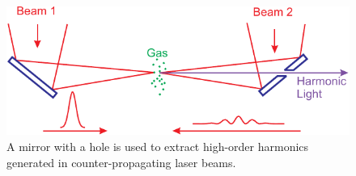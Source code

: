 \documentclass[oneside, astronomy, noacknowlegments]{BYUPhys}
\begin{document}
\begin{figure}
    \centerline{\includegraphics{Graphic1}}
    \caption[Experimental ODMR for CdTe]{\label{fig:CdTeResults}
     A mirror with a hole is used to extract high-order harmonics generated in
     counter-propagating laser beams.}
 \end{figure}


\section{}
\section{}
\end{document}

